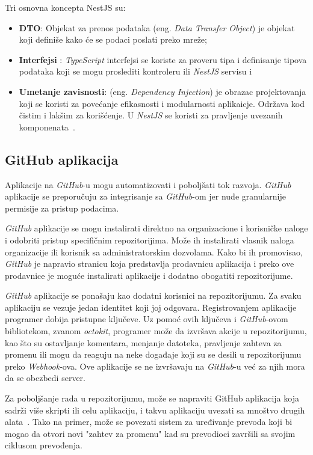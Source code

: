 Tri osnovna koncepta NestJS su:
\begin{itemize}
\item \textbf{DTO}: Objekat za prenos podataka (eng. \textit{Data Transfer Object}) je objekat 
koji definiše kako će se podaci poslati preko mreže;
\item \textbf{Interfejsi} : \textit{TypeScript} interfejsi se koriste za proveru tipa i 
definisanje tipova podataka koji se mogu proslediti kontroleru ili \textit{NestJS} servisu i
\item \textbf{Umetanje zavisnosti}: (eng. \textit{Dependency Injection}) je obrazac projektovanja 
koji se koristi za povećanje efikasnosti i modularnosti aplikaicje. Održava kod čistim i 
lakšim za korišćenje. U \textit{NestJS} se koristi za pravljenje uvezanih komponenata~\cite{nest_getting_started}.
\end{itemize}

\subsection{GitHub aplikacija}\label{sec:github_app}
Aplikacije na \textit{GitHub}-u mogu automatizovati i poboljšati tok razvoja. \textit{GitHub} 
aplikacije se preporučuju za integrisanje sa \textit{GitHub}-om jer nude granularnije permisije 
za pristup podacima. 

\textit{GitHub} aplikacije se mogu instalirati direktno na organizacione i korisničke naloge i 
odobriti pristup specifičnim repozitorijima. Može ih instalirati vlasnik naloga organizacije 
ili korisnik sa administratorskim dozvolama. Kako bi ih promovisao, \textit{GitHub} je napravio
stranicu koja predstavlja prodavnicu aplikacija i preko ove prodavnice je moguće instalirati 
aplikacije i dodatno obogatiti repozitorijume.

\textit{GitHub} aplikacije se ponašaju kao dodatni korisnici na repozitorijumu. Za svaku 
aplikaciju se vezuje jedan identitet koji joj odgovara. Registrovanjem aplikacije programer 
dobija pristupne ključeve. Uz pomoć ovih ključeva i \textit{GitHub}-ovom bibliotekom, zvanom \textit{octokit},
programer može da izvršava akcije u repozitorijumu, kao što su ostavljanje komentara,
menjanje datoteka, pravljenje zahteva za promenu ili mogu da reaguju na neke događaje koji su se 
desili u repozitorijumu preko \textit{Webhook}-ova. Ove aplikacije se ne izvršavaju na 
\textit{GitHub}-u već za njih mora da se obezbedi server. 

Za poboljšanje rada u repozitorijumu, može se napraviti GitHub aplikacija koja sadrži više skripti 
ili celu aplikaciju, i takvu aplikaciju uvezati sa mnoštvo drugih alata~\cite{github_apps}. Tako na 
primer, može se povezati sistem za uređivanje prevoda koji bi mogao da otvori novi "zahtev za promenu"
kad su prevodioci završili sa svojim ciklusom prevođenja.

